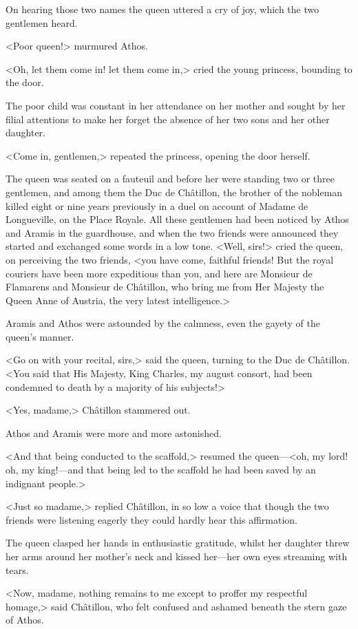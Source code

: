 On hearing those two names the queen uttered a cry of joy, which the two gentlemen heard.

<Poor queen!> murmured Athos.

<Oh, let them come in! let them come in,> cried the young princess, bounding to the door.

The poor child was constant in her attendance on her mother and sought by her filial attentions to make her forget the absence of her two sons and her other daughter.

<Come in, gentlemen,> repeated the princess, opening the door herself.

The queen was seated on a fauteuil and before her were standing two or three gentlemen, and among them the Duc de Châtillon, the brother of the nobleman killed eight or nine years previously in a duel on account of Madame de Longueville, on the Place Royale. All these gentlemen had been noticed by Athos and Aramis in the guardhouse, and when the two friends were announced they started and exchanged some words in a low tone. <Well, sirs!> cried the queen, on perceiving the two friends, <you have come, faithful friends! But the royal couriers have been more expeditious than you, and here are Monsieur de Flamarens and Monsieur de Châtillon, who bring me from Her Majesty the Queen Anne of Austria, the very latest intelligence.>

Aramis and Athos were astounded by the calmness, even the gayety of the queen's manner.

<Go on with your recital, sirs,> said the queen, turning to the Duc de Châtillon. <You said that His Majesty, King Charles, my august consort, had been condemned to death by a majority of his subjects!>

<Yes, madame,> Châtillon stammered out.

Athos and Aramis were more and more astonished.

<And that being conducted to the scaffold,> resumed the queen—<oh, my lord! oh, my king!—and that being led to the scaffold he had been saved by an indignant people.>

<Just so madame,> replied Châtillon, in so low a voice that though the two friends were listening eagerly they could hardly hear this affirmation.

The queen clasped her hands in enthusiastic gratitude, whilst her daughter threw her arms around her mother's neck and kissed her—her own eyes streaming with tears.

<Now, madame, nothing remains to me except to proffer my respectful homage,> said Châtillon, who felt confused and ashamed beneath the stern gaze of Athos.

